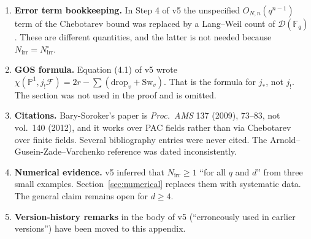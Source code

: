 \documentclass[11pt,a4paper]{article}
\theoremstyle{definition}
\theoremstyle{remark}
\newcommand{\Fq}{\mathbb{F}_q}
\newcommand{\Nirr}{N_{\mathrm{irr}}}
\begin{document}
\begin{enumerate}[label=E\arabic*.,leftmargin=*]
      \cite[Thm.~12]{Katz2001}. That theorem bounds Betti numbers of Artin--Schreier and Kummer
      sheaves $\mathcal L_\psi(f)\otimes\mathcal L_\rho(G)$, not of push-forwards of finite covers.
      The general bounds for compatible systems in \cite{Katz2001} are not explicit.
      So the threshold $(8d)^{2d+6}$ was unproved. Replaced by Corollary~\ref{cor:threshold}.
\item \textbf{Error term bookkeeping.} In Step 4 of v5 the unspecified $O_{N,n}(q^{n-1})$ term of the
      Chebotarev bound was replaced by a Lang--Weil count of $\mathcal D(\Fq)$. These are different
      quantities, and the latter is not needed because $\Nirr=\Nirr^\circ$.
\item \textbf{GOS formula.} Equation (4.1) of v5 wrote $\chi(\mathbb P^1,j_!\mathcal F)=2r-\sum(\mathrm{drop}_v+\mathrm{Sw}_v)$.
      That is the formula for $j_*$, not $j_!$. The section was not used in the proof and is omitted.
\item \textbf{Citations.} Bary-Soroker's paper is \emph{Proc.\ AMS} 137 (2009), 73--83, not vol.\ 140 (2012),
      and it works over PAC fields rather than via Chebotarev over finite fields.
      Several bibliography entries were never cited.
      The Arnold--Gusein-Zade--Varchenko reference was dated inconsistently.
\item \textbf{Numerical evidence.} v5 inferred that $\Nirr\ge1$ ``for all $q$ and $d$'' from three small
      examples. Section~\ref{sec:numerical} replaces them with systematic data. The general claim
      remains open for $d\ge4$.
\item \textbf{Version-history remarks} in the body of v5 (``erroneously used in earlier versions'')
      have been moved to this appendix.
\end{enumerate}
\end{document}
